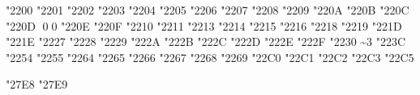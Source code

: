  {} "2200
 {} "2201
 {} "2202
 {} "2203
 {} "2204
 {} "2205
 {} "2206
 {} "2207
 {} "2208
 {} "2209
 {} "220A
 {} "220B
 {} "220C
 {} "220D
 \qed          0 "220E
 {} "220F
 {} "2210
 {} "2211
 {} "2213
 {} "2214
 {} "2215
 {} "2216
 {} "2218
 {} "2219
 {} "221D
 {} "221E
 {} "2227
 {} "2228
 {} "2229
 {} "222A
 {} "222B
 {} "222C
 {} "222D
 {} "222E
 {} "222F
 {} "2230
 \sim          3 "223C
 {} "2254
 {} "2255
 {} "2264
 {} "2265
 {} "2266
 {} "2267
 {} "2268
 {} "2269
 {} "22C0
 {} "22C1
 {} "22C2
 {} "22C3
 {} "22C5

\let \bigvee=\biglor
\let \bigwedge=\bigland
\let \le=\leq
\let \ge=\geq
\let \vee=\lor
\let \wedge=\land

\def \sqrt   {\Uradical \z@ "221A }
\def \int    {\intop    \nolimits}
\def \iint   {\iintop   \nolimits}
\def \iiint  {\iiintop  \nolimits}
\def \oint   {\ointop   \nolimits}
\def \oiint  {\oiintop  \nolimits}
\def \oiiint {\oiiintop \nolimits}


 {} "27E8
 {} "27E9


